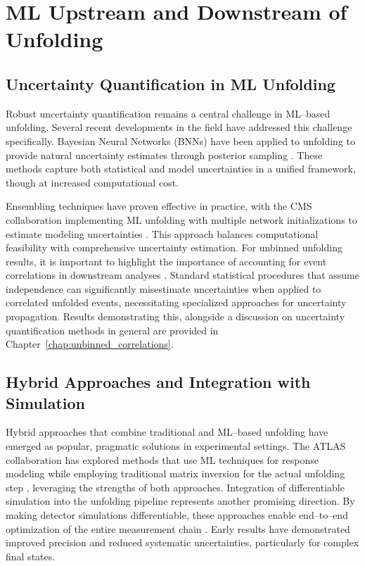 \section{ML Upstream and Downstream of Unfolding}
\subsection{Uncertainty Quantification in ML Unfolding}

    Robust uncertainty quantification remains a central challenge in ML--based unfolding.
    Several recent developments in the field have addressed this challenge specifically.
    Bayesian Neural Networks (BNNs) have been applied to unfolding to provide natural uncertainty estimates through posterior sampling .
    These methods capture both statistical and model uncertainties in a unified framework, though at increased computational cost.

    Ensembling techniques have proven effective in practice, with the CMS collaboration implementing ML unfolding with multiple network initializations to estimate modeling uncertainties .
    This approach balances computational feasibility with comprehensive uncertainty estimation.
    For unbinned unfolding results, it is important to highlight the importance of accounting for event correlations in downstream analyses .
    Standard statistical procedures that assume independence can significantly misestimate uncertainties when applied to correlated unfolded events, necessitating specialized approaches for uncertainty propagation.
    Results demonstrating this, alongside a discussion on uncertainty quantification methods in general are provided in Chapter~\ref{chap:unbinned_correlations}.

\subsection{Hybrid Approaches and Integration with Simulation}

    Hybrid approaches that combine traditional and ML--based unfolding have emerged as popular, pragmatic solutions in experimental settings.
    The ATLAS collaboration has explored methods that use ML techniques for response modeling while employing traditional matrix inversion for the actual unfolding step , leveraging the strengths of both approaches.
    Integration of differentiable simulation into the unfolding pipeline represents another promising direction.
    By making detector simulations differentiable, these approaches enable end--to--end optimization of the entire measurement chain .
    Early results have demonstrated improved precision and reduced systematic uncertainties, particularly for complex final states.

